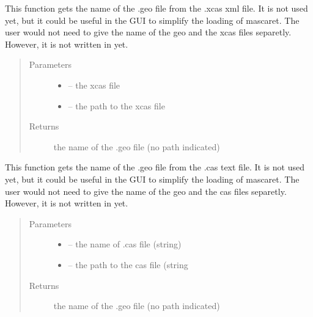 \documentclass[letterpaper,10pt,english]{sphinxmanual}
\begin{document}

\begin{fulllineitems}
\label{\detokenize{index:src.mascaret.get_geo_name_from_xcas}}
This function gets the name of the .geo file from the .xcas xml file. It is not used yet, but it could be useful
in the GUI to simplify the loading of mascaret. The user would not need to give the name of the geo and the xcas
files separetly. However, it is not written in yet.
\begin{quote}\begin{description}
\item[{Parameters}] \leavevmode\begin{itemize}
\item {} 
 -- the xcas file

\item {} 
 -- the path to the xcas file

\end{itemize}

\item[{Returns}] \leavevmode
the name of the .geo file (no path indicated)

\end{description}\end{quote}

\end{fulllineitems}


\begin{fulllineitems}
\label{\detokenize{index:src.mascaret.get_name_from_cas}}
This function gets the name of the .geo file from the .cas text file. It is not used yet, but it could be useful
in the GUI to simplify the loading of mascaret. The user would not need to give the name of the geo and the cas
files separetly. However, it is not written in yet.
\begin{quote}\begin{description}
\item[{Parameters}] \leavevmode\begin{itemize}
\item {} 
 -- the name of .cas file (string)

\item {} 
 -- the path to the cas file (string

\end{itemize}

\item[{Returns}] \leavevmode
the name of the .geo file (no path indicated)

\end{description}\end{quote}

\end{fulllineitems}
\end{document}
